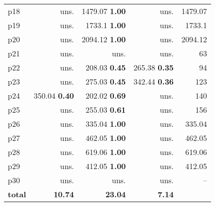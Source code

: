 \begin{tabular}{|l|rrr|r|}
p18 & uns. & {\footnotesize 1479.07} \textbf{1.00} & uns. & 1479.07\\
p19 & uns. & {\footnotesize 1733.1} \textbf{1.00} & uns. & 1733.1\\
p20 & uns. & {\footnotesize 2094.12} \textbf{1.00} & uns. & 2094.12\\
p21 & uns. & uns. & uns. & 63\\
p22 & uns. & {\footnotesize 208.03} \textbf{0.45} & {\footnotesize 265.38} \textbf{0.35} & 94\\
p23 & uns. & {\footnotesize 275.03} \textbf{0.45} & {\footnotesize 342.44} \textbf{0.36} & 123\\
p24 & {\footnotesize 350.04} \textbf{0.40} & {\footnotesize 202.02} \textbf{0.69} & uns. & 140\\
p25 & uns. & {\footnotesize 255.03} \textbf{0.61} & uns. & 156\\
p26 & uns. & {\footnotesize 335.04} \textbf{1.00} & uns. & 335.04\\
p27 & uns. & {\footnotesize 462.05} \textbf{1.00} & uns. & 462.05\\
p28 & uns. & {\footnotesize 619.06} \textbf{1.00} & uns. & 619.06\\
p29 & uns. & {\footnotesize 412.05} \textbf{1.00} & uns. & 412.05\\
p30 & uns. & uns. & uns. & --\\
\hline
\textbf{total} & \textbf{10.74} & \textbf{23.04} & \textbf{7.14} & \\
\hline
\end{tabular}

